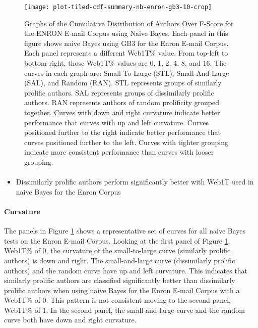 	\begin{figure}[htbp!]
		\begin{center}
		\centering
		\texttt{[image: plot-tiled-cdf-summary-nb-enron-gb3-10-crop]}
		\caption{Graphs of the Cumulative Distribution of Authors Over F-Score for the ENRON E-mail Corpus using Naive Bayes. Each panel in this figure shows naive Bayes using GB3 for the Enron E-mail Corpus.  Each panel represents a different Web1T\% value.  From top-left to bottom-right, those Web1T\% values are 0, 1, 2, 4, 8, and 16.  The curves in each graph are: Small-To-Large (STL), Small-And-Large (SAL), and Random (RAN).  STL represents groups of similarly prolific authors.  SAL represents groups of dissimilarly prolific authors.  RAN represents authors of random prolificity grouped together.  Curves with down and right curvature indicate better performance that curves with up and left curvature.  Curves positioned further to the right indicate better performance that curves positioned further to the left.  Curves with tighter grouping indicate more consistent performance than curves with looser grouping.}
		\label{fig:plot-tiled-cdf-summary-nb-enron-gb3-10}
		\end{center}
	\end{figure}
	
	\paragraph*{}
	\begin{itemize}
	\item Dissimilarly prolific authors perform significantly better with Web1T used in naive Bayes for the Enron Corpus
	\end{itemize}
	\paragraph*{Curvature}The panels in Figure \ref{fig:plot-tiled-cdf-summary-nb-enron-gb3-10} shows a representative set of curves for all naive Bayes tests on the Enron E-mail Corpus.  Looking at the first panel of Figure \ref{fig:plot-tiled-cdf-summary-nb-enron-gb3-10}, Web1T\% of 0, the curvature of the small-to-large curve (similarly prolific authors) is down and right.  The small-and-large curve (dissimilarly prolific authors) and the random curve have up and left curvature.  This indicates that similarly prolific authors are classified significantly better than dissimilarly prolific authors when using naive Bayes for the Enron E-mail Corpus with a Web1T\% of 0.  This pattern is not consistent moving to the second panel, Web1T\% of 1.  In the second panel, the small-and-large curve and the random curve  both have down and right curvature.  
